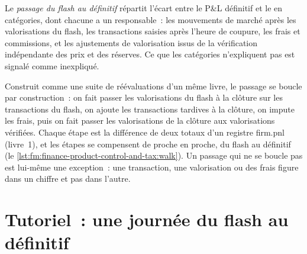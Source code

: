 \begin{definition}\label{def:fm:finance-product-control-and-tax:walk}
Le \emph{passage du flash au définitif} répartit l'écart entre le P\&L définitif et le  en catégories, dont chacune a un
responsable~: les mouvements de marché après les valorisations du flash, les transactions saisies après l'heure de coupure, les frais et commissions, et les ajustements de valorisation issus de la
vérification indépendante des prix et des réserves. Ce que les catégories n'expliquent pas est signalé comme inexpliqué.
\end{definition}

Construit comme une suite de réévaluations d'un même livre, le passage se boucle par construction~: on fait passer les valorisations du flash à la clôture sur les transactions du flash, on ajoute
les transactions tardives à la clôture, on impute les frais, puis on fait passer les valorisations de la clôture aux valorisations vérifiées. Chaque étape est la différence de deux totaux d'un registre firm.pnl
(livre~1), et les étapes se compensent de proche en proche, du flash au définitif (le \cref{lst:fm:finance-product-control-and-tax:walk}). Un passage qui ne se boucle pas
est lui-même une exception~: une transaction, une valorisation ou des frais figure dans un chiffre et pas dans l'autre.

\label{lst:fm:finance-product-control-and-tax:walk}

\section{Tutoriel~: une journée du flash au définitif}\label{tut:fm:finance-product-control-and-tax:tut}

